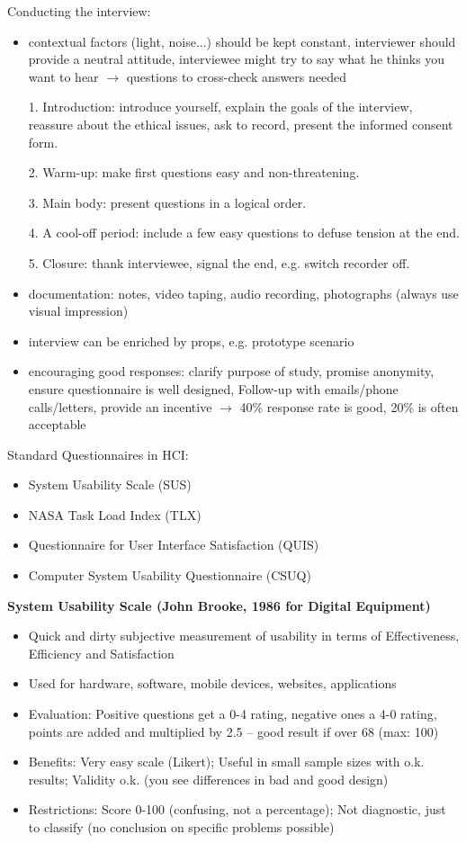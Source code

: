Conducting the interview:
\begin{itemize}
\item contextual factors (light, noise...) should be kept constant, interviewer should provide a neutral attitude, interviewee might try to say what he thinks you want to hear $\rightarrow$ questions to cross-check answers needed
\item[1.] Introduction: introduce yourself, explain the goals of the interview, reassure about the ethical issues, ask to record, present the informed consent form.
\item[2.] Warm-up: make first questions easy and non-threatening.
\item[3.] Main body: present questions in a logical order.
\item[4.] A cool-off period: include a few easy questions to defuse tension at the end.
\item[5.] Closure: thank interviewee, signal the end, e.g. switch recorder off.
\item documentation: notes, video taping, audio recording, photographs (always use visual impression)
\item interview can be enriched by props, e.g. prototype scenario
\item encouraging good responses: clarify purpose of study, promise anonymity, ensure questionnaire is well designed, Follow-up with emails/phone calls/letters, provide an incentive
$\rightarrow$ 40\% response rate is good, 20\% is often acceptable
\end{itemize}
Standard Questionnaires in HCI:
\begin{itemize}
\item System Usability Scale (SUS)
\item NASA Task Load Index (TLX)
\item Questionnaire for User Interface Satisfaction (QUIS)
\item Computer System Usability Questionnaire (CSUQ)
\end{itemize}
\textbf{System Usability Scale (John Brooke, 1986 for Digital Equipment) }
\begin{itemize}
\item Quick and dirty subjective measurement of usability in terms of Effectiveness, Efficiency and Satisfaction
\item Used for hardware, software, mobile devices, websites, applications
\item Evaluation: Positive questions get a 0-4 rating, negative ones a 4-0 rating, points are added and multiplied by 2.5 -- good result if over 68 (max: 100)
\item Benefits: Very easy scale (Likert); Useful in small sample sizes with o.k. results; Validity o.k. (you see differences in bad and good design)
\item Restrictions: Score 0-100 (confusing, not a percentage); Not diagnostic, just to classify (no conclusion on specific problems possible)
\end{itemize}
